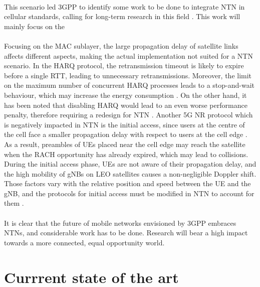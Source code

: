 \paragraph{}
This scenario led \ac{3GPP} to identify some work to be done to integrate \ac{NTN} in cellular standards, calling for long-term research in this field \cite{satellite-communication-mmwave-giordani}. This work will mainly focus on the 

\paragraph{} Focusing on the \ac{MAC} sublayer, the large propagation delay of satellite links affects different aspects, making the actual implementation not suited for a \ac{NTN} scenario. In the \ac{HARQ} protocol, the retransmission timeout is likely to expire before a single \ac{RTT}, leading to unnecessary retransmissions. Moreover, the limit on the maximum number of concurrent \ac{HARQ} processes leads to a stop-and-wait behaviour, which may increase the energy consumption \cite{3gpp-tr-38.811}. On the other hand, it has been noted that disabling \ac{HARQ} would lead to an even worse performance penalty, therefore requiring a redesign for \ac{NTN} \cite{5g-beyond-5g-ntn-trends-vanellicoralli}. Another 5G \ac{NR} protocol which is negatively impacted in \ac{NTN} is the initial access, since users at the centre of the cell face a smaller propagation delay with respect to users at the cell edge \cite{5g-beyond-5g-ntn-trends-vanellicoralli} \cite{applying-nr-technologies-in-ntn-lee}. As a result, preambles of \ac{UE}s placed near the cell edge may reach the satellite when the \ac{RACH} opportunity has already expired, which may lead to collisions. During the initial access phase, \ac{UE}s are not aware of their propagation delay, and the high mobility of \ac{gNB}s on \ac{LEO} satellites causes a non-negligible Doppler shift. Those factors vary with the relative position and speed between the \ac{UE} and the \ac{gNB}, and the protocols for initial access must be modified in \ac{NTN} to account for them \cite{ntn-from-5g-6g-hassan}. 
\paragraph{}
It is clear that the future of mobile networks envisioned by \ac{3GPP} embraces \ac{NTN}s, and considerable work has to be done. Research will bear a high impact towards a more connected, equal opportunity world. 

\section{Currrent state of the art}
